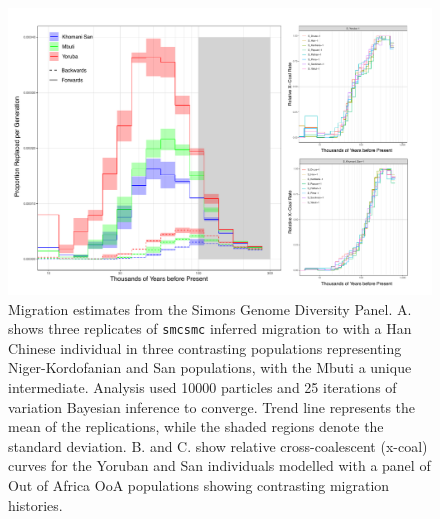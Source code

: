 \documentclass{article}
\begin{document}
\begin{figure}
	\centering
	\includegraphics[width=\textwidth]{../plot/mig/mig.pdf}
	\caption{Migration estimates from the Simons Genome Diversity Panel. A. shows three replicates of {\tt smcsmc} inferred migration to with a Han Chinese individual in three contrasting populations representing Niger-Kordofanian and San populations, with the Mbuti a unique intermediate. Analysis used 10000 particles and 25 iterations of variation Bayesian inference to converge. Trend line represents the mean of the replications, while the shaded regions denote the standard deviation. B. and C. show relative cross-coalescent (x-coal) curves for the Yoruban and San individuals modelled with a panel of Out of Africa OoA populations showing contrasting migration histories.}
	\label{migrationplot}
\end{figure}
\end{document}
